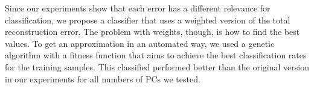 \documentclass[10pt, conference, compsocconf]{IEEEtran}
\begin{document}
Since our experiments show that each error has a different relevance for classification, we propose a classifier that uses a weighted version of the total reconstruction error. The problem with weights, though, is how to find the best values. To get an approximation in an automated way, we used a genetic algorithm with a fitness function that aims to achieve the best classification rates for the training samples. This classified performed better than the original version in our experiments for all numbers of PCs we tested. %






% 
% 






%






\end{document}
